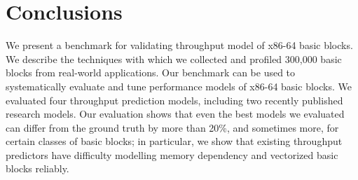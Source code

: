 \section{Conclusions}
We present a benchmark for validating throughput model of x86-64 basic blocks.
We describe the techniques with which we collected
and profiled 300,000 basic blocks from real-world applications.
Our benchmark can be used to systematically evaluate and tune performance models
of x86-64 basic blocks.
We evaluated four throughput prediction models, including two recently
published research models.
Our evaluation shows that even the best models we evaluated can differ from
the ground truth by more than 20\%, and sometimes more, 
for certain classes of basic blocks;
in particular, we show that existing throughput predictors have difficulty 
modelling memory dependency and vectorized basic blocks reliably.